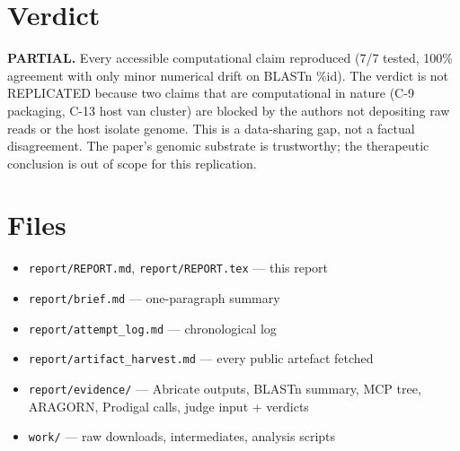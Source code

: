 \documentclass[11pt,letterpaper]{article}
\begin{document}
\section{Verdict}

\textbf{PARTIAL.} Every accessible computational claim reproduced (7/7 tested, 100\% agreement with only minor numerical drift on BLASTn \%id). The verdict is not REPLICATED because two claims that are computational in nature (C-9 packaging, C-13 host van cluster) are blocked by the authors not depositing raw reads or the host isolate genome. This is a data-sharing gap, not a factual disagreement. The paper's genomic substrate is trustworthy; the therapeutic conclusion is out of scope for this replication.

\section{Files}

\begin{itemize}[noitemsep]
  \item \texttt{report/REPORT.md}, \texttt{report/REPORT.tex} --- this report
  \item \texttt{report/brief.md} --- one-paragraph summary
  \item \texttt{report/attempt\_log.md} --- chronological log
  \item \texttt{report/artifact\_harvest.md} --- every public artefact fetched
  \item \texttt{report/evidence/} --- Abricate outputs, BLASTn summary, MCP tree, ARAGORN, Prodigal calls, judge input + verdicts
  \item \texttt{work/} --- raw downloads, intermediates, analysis scripts
\end{itemize}
\end{document}
